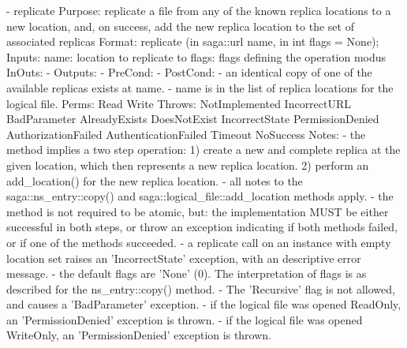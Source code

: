\begin{myspec}
 
    - replicate 
      Purpose:  replicate a file from any of the known
                replica locations to a new location, and, on 
                success, add the new replica location to the 
                set of associated replicas 
      Format:   replicate        (in  saga::url name, 
                                  in  int       flags = None);
      Inputs:   name:             location to replicate to
                flags:            flags defining the operation
                                  modus
      InOuts:   -
      Outputs:  -
      PreCond:  -
      PostCond: - an identical copy of one of the available
                  replicas exists at name.
                - name is in the list of replica locations
                  for the logical file.
      Perms:    Read 
                Write
      Throws:   NotImplemented
                IncorrectURL
                BadParameter
                AlreadyExists
                DoesNotExist
                IncorrectState
                PermissionDenied
                AuthorizationFailed
                AuthenticationFailed
                Timeout
                NoSuccess
      Notes:    - the method implies a two step operation:
                  1) create a new and complete replica at the
                     given location, which then represents
                     a new replica location.
                  2) perform an add_location() for the new
                     replica location.
                - all notes to the saga::ns_entry::copy() and
                  saga::logical_file::add_location methods
                  apply.
                - the method is not required to be atomic, but:
                  the implementation MUST be either
                  successful in both steps, or throw an
                  exception indicating if both methods failed, 
                  or if one of the methods succeeded.
                - a replicate call on an instance with empty
                  location set raises an 'IncorrectState'
                  exception, with an descriptive error message.  
                - the default flags are 'None' (0).  The
                  interpretation of flags is as described for 
                  the ns_entry::copy() method.  
                - The 'Recursive' flag is not allowed, and 
                  causes a 'BadParameter' exception.
                - if the logical file was opened ReadOnly, an
                  'PermissionDenied' exception is thrown.
                - if the logical file was opened WriteOnly, an
                  'PermissionDenied' exception is thrown.
 \end{myspec}
 

